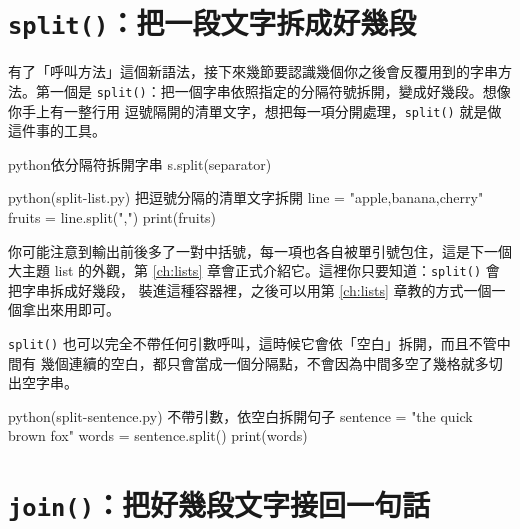 \section{\texttt{split()}：把一段文字拆成好幾段}
\label{sec:split-method}

有了「呼叫方法」這個新語法，接下來幾節要認識幾個你之後會反覆用到的字串方法。第一個是
\texttt{split()}：把一個字串依照指定的分隔符號拆開，變成好幾段。想像你手上有一整行用
逗號隔開的清單文字，想把每一項分開處理，\texttt{split()} 就是做這件事的工具。

\begin{code}{python}{依分隔符拆開字串}
s.split(separator)
\end{code}

\begin{example}{python}{(split-list.py) 把逗號分隔的清單文字拆開}
line = "apple,banana,cherry"
fruits = line.split(",")
print(fruits)
\end{example}


你可能注意到輸出前後多了一對中括號，每一項也各自被單引號包住，這是下一個大主題 list
的外觀，第 \ref{ch:lists} 章會正式介紹它。這裡你只要知道：\texttt{split()} 會把字串拆成好幾段，
裝進這種容器裡，之後可以用第 \ref{ch:lists} 章教的方式一個一個拿出來用即可。

\texttt{split()} 也可以完全不帶任何引數呼叫，這時候它會依「空白」拆開，而且不管中間有
幾個連續的空白，都只會當成一個分隔點，不會因為中間多空了幾格就多切出空字串。

\begin{example}{python}{(split-sentence.py) 不帶引數，依空白拆開句子}
sentence = "the quick   brown fox"
words = sentence.split()
print(words)
\end{example}



\section{\texttt{join()}：把好幾段文字接回一句話}
\label{sec:join-method}

